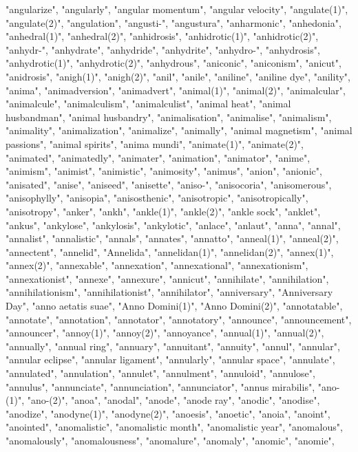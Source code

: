 "angularize",
"angularly",
"angular momentum",
"angular velocity",
"angulate(1)",
"angulate(2)",
"angulation",
"angusti-",
"angustura",
"anharmonic",
"anhedonia",
"anhedral(1)",
"anhedral(2)",
"anhidrosis",
"anhidrotic(1)",
"anhidrotic(2)",
"anhydr-",
"anhydrate",
"anhydride",
"anhydrite",
"anhydro-",
"anhydrosis",
"anhydrotic(1)",
"anhydrotic(2)",
"anhydrous",
"aniconic",
"aniconism",
"anicut",
"anidrosis",
"anigh(1)",
"anigh(2)",
"anil",
"anile",
"aniline",
"aniline dye",
"anility",
"anima",
"animadversion",
"animadvert",
"animal(1)",
"animal(2)",
"animalcular",
"animalcule",
"animalculism",
"animalculist",
"animal heat",
"animal husbandman",
"animal husbandry",
"animalisation",
"animalise",
"animalism",
"animality",
"animalization",
"animalize",
"animally",
"animal magnetism",
"animal passions",
"animal spirits",
"anima mundi",
"animate(1)",
"animate(2)",
"animated",
"animatedly",
"animater",
"animation",
"animator",
"anime",
"animism",
"animist",
"animistic",
"animosity",
"animus",
"anion",
"anionic",
"anisated",
"anise",
"aniseed",
"anisette",
"aniso-",
"anisocoria",
"anisomerous",
"anisophylly",
"anisopia",
"anisosthenic",
"anisotropic",
"anisotropically",
"anisotropy",
"anker",
"ankh",
"ankle(1)",
"ankle(2)",
"ankle sock",
"anklet",
"ankus",
"ankylose",
"ankylosis",
"ankylotic",
"anlace",
"anlaut",
"anna",
"annal",
"annalist",
"annalistic",
"annals",
"annates",
"annatto",
"anneal(1)",
"anneal(2)",
"annectent",
"annelid",
"Annelida",
"annelidan(1)",
"annelidan(2)",
"annex(1)",
"annex(2)",
"annexable",
"annexation",
"annexational",
"annexationism",
"annexationist",
"annexe",
"annexure",
"annicut",
"annihilate",
"annihilation",
"annihilationism",
"annihilationist",
"annihilator",
"anniversary",
"Anniversary Day",
"anno aetatis suae",
"Anno Domini(1)",
"Anno Domini(2)",
"annotatable",
"annotate",
"annotation",
"annotator",
"annotatory",
"announce",
"announcement",
"announcer",
"annoy(1)",
"annoy(2)",
"annoyance",
"annual(1)",
"annual(2)",
"annually",
"annual ring",
"annuary",
"annuitant",
"annuity",
"annul",
"annular",
"annular eclipse",
"annular ligament",
"annularly",
"annular space",
"annulate",
"annulated",
"annulation",
"annulet",
"annulment",
"annuloid",
"annulose",
"annulus",
"annunciate",
"annunciation",
"annunciator",
"annus mirabilis",
"ano-(1)",
"ano-(2)",
"anoa",
"anodal",
"anode",
"anode ray",
"anodic",
"anodise",
"anodize",
"anodyne(1)",
"anodyne(2)",
"anoesis",
"anoetic",
"anoia",
"anoint",
"anointed",
"anomalistic",
"anomalistic month",
"anomalistic year",
"anomalous",
"anomalously",
"anomalousness",
"anomalure",
"anomaly",
"anomic",
"anomie",
